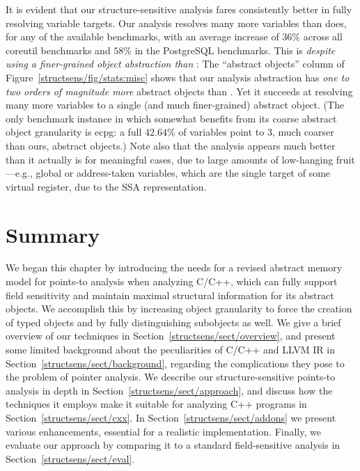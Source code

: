 It is evident that our structure-sensitive analysis fares consistently
better in fully resolving variable targets. Our analysis resolves many
more variables than \pearce{} does, for any of the available
benchmarks, with an average increase of $36\%$ across all coreutil
benchmarks and $58\%$ in the PostgreSQL benchmarks.  This is
\emph{despite using a finer-grained object abstraction than
  \pearce{}}: The ``abstract objects'' column of
Figure~\ref{structsens/fig/stats:misc} shows that our analysis
abstraction has \emph{one to two orders of magnitude more} abstract
objects than \pearce{}. Yet it succeeds at resolving many more
variables to a single (and much finer-grained) abstract object. (The
only benchmark instance in which \pearce{} somewhat benefits from its
coarse abstract object granularity is ecpg: a full $42.64\%$ of
variables point to 3, much coarser than ours, abstract objects.) Note
also that the \pearce{} analysis appears much better than it actually
is for meaningful cases, due to large amounts of low-hanging
fruit---e.g., global or address-taken variables, which are the single
target of some virtual register, due to the SSA representation.


\section{Summary}

We began this chapter by introducing the needs for a revised abstract
memory model for points-to analysis when analyzing C/C++, which can
fully support field sensitivity and maintain maximal structural
information for its abstract objects. We accomplish this by increasing
object granularity to force the creation of typed objects and by fully
distinguishing subobjects as well. We give a brief overview of our
techniques in Section~\ref{structsens/sect/overview}, and present some
limited background about the peculiarities of C/C++ and LLVM IR in
Section~\ref{structsens/sect/background}, regarding the complications
they pose to the problem of pointer analysis. We describe our
structure-sensitive points-to analysis in depth in
Section~\ref{structsens/sect/approach}, and discuss how the techniques
it employs make it suitable for analyzing C++ programs in
Section~\ref{structsens/sect/cxx}. In
Section~\ref{structsens/sect/addons} we present various enhancements,
essential for a realistic implementation. Finally, we evaluate our
approach by comparing it to a standard field-sensitive analysis in
Section~\ref{structsens/sect/eval}.

